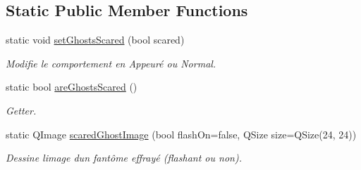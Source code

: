 \subsection*{Static Public Member Functions}
\begin{DoxyCompactItemize}
\item 
static void \hyperlink{class_ghost_adb0d9cf00e0918c43abeb4c1bfc116ec}{set\+Ghosts\+Scared} (bool scared)
\begin{DoxyCompactList}\small\item\em Modifie le comportement en Appeuré ou Normal. \end{DoxyCompactList}\item 
static bool \hyperlink{class_ghost_a09869588955cc6014359262e4f199300}{are\+Ghosts\+Scared} ()
\begin{DoxyCompactList}\small\item\em Getter. \end{DoxyCompactList}\item 
static Q\+Image \hyperlink{class_ghost_aa032481d2ebe66d71b4b0744f043574d}{scared\+Ghost\+Image} (bool flash\+On=false, Q\+Size size=Q\+Size(24, 24))
\begin{DoxyCompactList}\small\item\em Dessine l\textquotesingle{}image d\textquotesingle{}un fantôme effrayé (flashant ou non). \end{DoxyCompactList}\end{DoxyCompactItemize}
